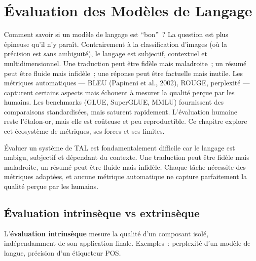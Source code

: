 \chapter{\'Evaluation des Mod\`eles de Langage}
\label{ch:evaluation}

Comment savoir si un mod\`ele de langage est ``bon''~? La question est plus \'epineuse qu'il n'y para\^it. Contrairement \`a la classification d'images (o\`u la pr\'ecision est sans ambigu\"it\'e), le langage est subjectif, contextuel et multidimensionnel. Une traduction peut \^etre fid\`ele mais maladroite~; un r\'esum\'e peut \^etre fluide mais infid\`ele~; une r\'eponse peut \^etre factuelle mais inutile. Les m\'etriques automatiques --- BLEU (Papineni et al., 2002), ROUGE, perplexité --- capturent certains aspects mais \'echouent \`a mesurer la qualit\'e per\c{c}ue par les humains. Les benchmarks (GLUE, SuperGLUE, MMLU) fournissent des comparaisons standardis\'ees, mais saturent rapidement. L'\'evaluation humaine reste l'\'etalon-or, mais elle est co\^uteuse et peu reproductible. Ce chapitre explore cet \'ecosyst\`eme de m\'etriques, ses forces et ses limites.

\begin{intuition}[title=\textbf{Pourquoi \'evaluer est difficile}]
\'Evaluer un syst\`eme de TAL est fondamentalement difficile car le
langage est ambigu, subjectif et d\'ependant du contexte. Une traduction
peut \^etre fid\`ele mais maladroite, un r\'esum\'e peut \^etre fluide
mais infid\`ele. Chaque t\^ache n\'ecessite des m\'etriques adapt\'ees,
et aucune m\'etrique automatique ne capture parfaitement la qualit\'e
per\c{c}ue par les humains.
\end{intuition}

\section{\'Evaluation intrins\`eque vs extrins\`eque}
\label{sec:eval:types}

\begin{definition}
L'\textbf{\'evaluation intrins\`eque} mesure la qualit\'e d'un composant
isol\'e, ind\'ependamment de son application finale. Exemples~:
perplexit\'e d'un mod\`ele de langue, pr\'ecision d'un \'etiqueteur POS.
\end{definition}

